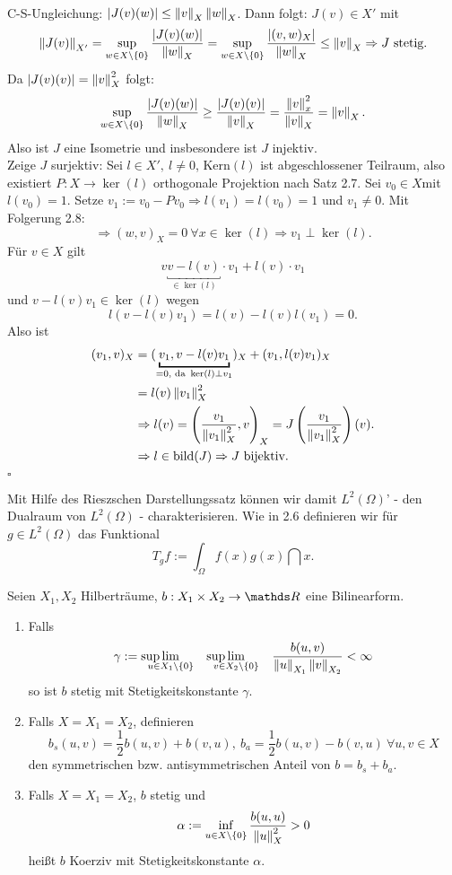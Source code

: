 \\
C-S-Ungleichung: $\left\vert J(v)(w)\right\vert\le \left\Vert v\right\Vert_X\left\Vert w\right\Vert_X$.
Dann folgt: $ J(v)\in X'$ mit 
\[
\left\Vert J(v)\right\Vert_{X'} = \sup\limits_{w\in X\backslash\{0\}} \frac{\left\vert J(v)(w)\right\vert}{\left\Vert w\right\Vert_X} = \sup\limits_{w\in X\backslash\{0\}} \frac{\left\vert(v,w)_X\right\vert}{\left\Vert w\right\Vert_X} \le \left\Vert v\right\Vert_X \Rightarrow J \text{ stetig}.
\]
Da $\left\vert J(v)(v)\right\vert = \left\Vert v\right\Vert_X^2$ folgt:
\[
\sup\limits_{w\in X\backslash\{0\}} \frac{\left\vert J(v)(w)\right\vert}{\left\Vert w\right\Vert_X} \ge \frac{\left\vert J(v)(v)\right\vert}{\left\Vert v\right\Vert_X} = \frac{\left\Vert v\right\Vert_x^2}{\left\Vert v\right\Vert_X} = \left\Vert v\right\Vert_X.
\]
Also ist $J$ eine Isometrie und insbesondere ist $J$ injektiv.\\
Zeige $J$ surjektiv: Sei $l\in X',~l\neq 0$, Kern$(l)$ ist abgeschlossener Teilraum, also existiert $P:X\to \ker(l)$ orthogonale Projektion nach Satz 2.7.
Sei $v_0\in X$mit $l(v_0)=1$. 
Setze $v_1:=v_0-Pv_0\Rightarrow l(v_1) =l(v_0) =1$ und $v_1\neq 0$.
Mit Folgerung 2.8:
\[
\Rightarrow (w,v)_X =0~ \forall x\in\ker(l) \Rightarrow v_1 \perp \ker(l). 
\]
Für $v\in X$ gilt
\[
v\underbracket{v-l(v)}_{\in \ker(l)}\cdot v_1 + l(v)\cdot v_1
\]
und $v-l(v)v_1\in \ker(l)$ wegen
\[
l(v-l(v)v_1) = l(v) -l(v)l(v_1) =0.
\]
Also ist
\begin{align*}
(v_1,v)_X &= (\underbracket{v_1,v-l(v)v_1}_{=0,\text{ da }\ker(l) \perp v_1})_X + (v_1,l(v)v_1)_X\\
&= l(v) \norm{v_1}_X^2\\
&\Rightarrow l(v) = \enbrace{\frac{v_1}{\norm{v_1}_X^2},v}_X = J\enbrace{\frac{v_1}{\norm{v_1}_X^2}}(v).\\
&\Rightarrow l\in \bild(J) \Rightarrow J\text{ bijektiv.}\\
\end{align*}
\hfill $\square$

Mit Hilfe des Rieszschen Darstellungssatz können wir damit $L^2(\Omega)$' - den Dualraum von $L^2(\Omega)$ - charakterisieren.
Wie in 2.6 definieren wir für $g\in L^2(\Omega)$ das Funktional
\[
T_g f := \int_{\Omega} f(x)g(x)\dint x.
\]

Seien $X_1,X_2$ Hilberträume, $b:X_1\times X_2 \to \R$ eine Bilinearform.
\begin{enumerate}[(1)]
	\item Falls 
	\[
	\gamma:= \sup\lim\ablim{u\in X_1\backslash\{0\}} \qquad\sup\lim\ablim{v\in X_2\backslash\{0\}}\qquad \frac{b(u,v)}{\norm{u}_{X_1}\norm{v}_{X_2}} < \infty
 	\]
 	so ist $b$ stetig mit Stetigkeitskonstante $\gamma$.
 	\item Falls $X=X_1=X_2$, definieren 
 	\[
 	b_s(u,v) = \frac{1}{2} b(u,v)+b(v,u),~b_a = \frac{1}{2} b(u,v)-b(v,u) ~\forall u,v\in X
 	\]
 	den symmetrischen bzw. antisymmetrischen Anteil von $b = b_s +b_a$.
 	\item Falls $X=X_1=X_2$, $b$ stetig und 
 	\[
 	\alpha := \inf\limits_{u\in X\backslash\{0\}} \frac{b(u,u)}{\left\Vert u\right\Vert_X^2} > 0
 	\]
 	heißt $b$ Koerziv mit Stetigkeitskonstante $\alpha$.
\end{enumerate}

